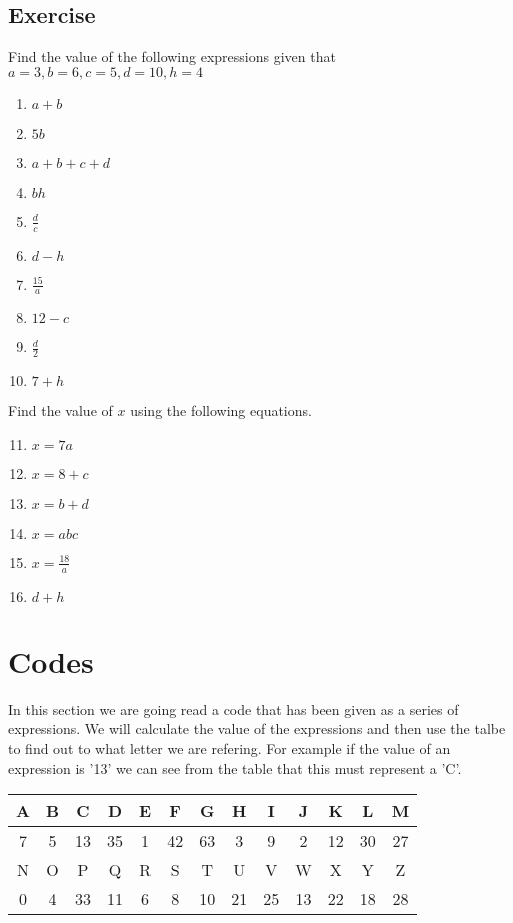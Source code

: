 \subsection{Exercise}
Find the value of the following expressions given that $a=3,b=6,c=5,d=10,h=4$
\begin{multicols}{2}
\begin{enumerate}
  \item $a+b$
  \item $5b$
  \item $a + b + c + d$
  \item $bh$
  \item $\displaystyle \frac{d}{c}$
  \item $d-h$
  \item $\displaystyle \frac{15}{a}$
  \item $12 - c$
  \item $\displaystyle \frac{d}{2}$
  \item $7+h$
\end{enumerate}
\end{multicols}
Find the value of $x$ using the following equations.
\begin{multicols}{2}
\begin{enumerate}
  \setcounter{enumi}{10}
  \item $x=7a$
  \item $x=8+c$
  \item $x=b+d$
  \item $x=abc$
  \item $\displaystyle x=\frac{18}{a}$
  \item $d+h$
\end{enumerate}
\end{multicols}
\section{Codes}
In this section we are going read a code that has been given as a series of expressions.  We will calculate the value of the expressions and then use the talbe to find out to what letter we are refering.  For example if the value of an expression is '13' we can see from the table that this must represent a 'C'.


\begin{tabular}{|c|c|c|c|c|c|c|c|c|c|c|c|c|}
  \hline
  A & B & C & D & E & F & G & H & I & J & K & L & M \\
  \hline
  7 & 5 & 13 & 35 & 1 & 42 & 63 & 3 & 9 & 2 & 12 & 30 & 27\\
  \hline
  \hline
  N & O & P & Q & R & S & T & U & V & W & X & Y & Z\\
  \hline
  0 & 4 & 33 & 11 & 6 & 8 & 10 & 21 & 25 & 13 & 22 & 18 & 28\\
  \hline
\end{tabular}

